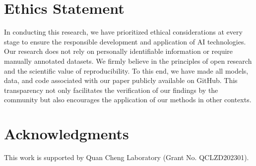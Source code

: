 \section{Ethics Statement}
In conducting this research, we have prioritized ethical considerations at every stage to ensure the responsible development and application of AI technologies. 
Our research does not rely on personally identifiable information or require manually annotated datasets. 
We firmly believe in the principles of open research and the scientific value of reproducibility. To this end, we have made all models, data, and code associated with our paper publicly available on GitHub. 
This transparency not only facilitates the verification of our findings by the community but also encourages the application of our methods in other contexts. 

\section*{Acknowledgments}
This work is supported by Quan Cheng Laboratory (Grant No. QCLZD202301).

